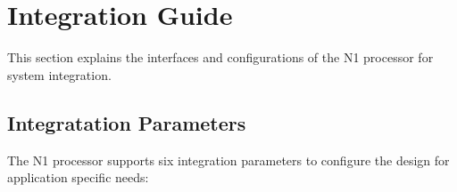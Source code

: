 
\section{Integration Guide}
\label{integration}

This section explains the interfaces and configurations of the N1 processor
for system integration.

\subsection{Integratation Parameters}
\label{integration:params}

The N1 processor supports six integration parameters to configure the design for
application specific needs:

